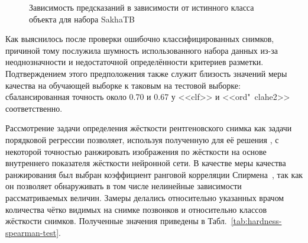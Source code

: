 \begin{figure}[ht]
	\caption{Зависимость предсказаний  в зависимости от истинного класса объекта для набора SakhaTB}
	\label{fig:hardness-class-separation}
\end{figure}

Как выяснилось после проверки ошибочно классифицированных снимков, причиной тому послужила шумность использованного набора данных из-за неоднозначности и недостаточной определённости критериев разметки. Подтверждением этого предположения также служит близость значений меры качества на обучающей выборке к таковым на тестовой выборке: сбалансированная точность около 0.70 и 0.67 у  <<clf>> и <<ord"~clahe2>> соответственно.

Рассмотрение задачи определения жёсткости рентгеновского снимка как задачи порядковой регрессии позволяет, используя полученную для её решения , с некоторой точностью ранжировать изображения по жёсткости на основе внутреннего показателя жёсткости нейронной сети. В качестве меры качества ранжирования был выбран коэффициент ранговой корреляции Спирмена~\cite{zwillinger1999crc}, так как он позволяет обнаруживать в том числе нелинейные зависимости рассматриваемых величин. Замеры делались относительно указанных врачом количества чётко видимых на снимке позвонков и относительно классов жёсткости снимков. Полученные значения приведены в Табл.~\ref{tab:hardness-spearman-test}.

